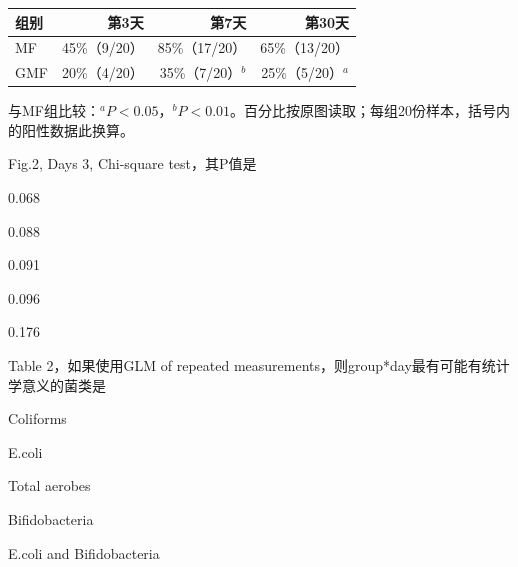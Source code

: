 \begin{center}\small\setlength{\tabcolsep}{5pt}\renewcommand{\arraystretch}{1.18}\begin{tabular}{@{}lrrr@{}}
\toprule
组别 & 第3天 & 第7天 & 第30天 \\
\midrule
MF & 45\%（9/20） & 85\%（17/20） & 65\%（13/20） \\
GMF & 20\%（4/20） & 35\%（7/20）\(^{b}\) & 25\%（5/20）\(^{a}\) \\
\bottomrule\end{tabular}\end{center}

与MF组比较：\(^{a}P<0.05\)，\(^{b}P<0.01\)。百分比按原图读取；每组20份样本，括号内的阳性数据此换算。


\par\addvspace{6pt}\noindent\begin{minipage}{\linewidth}


Fig.2, Days 3, Chi-square test，其P值是


\begin{choices}

\item 0.068

\item 0.088

\item 0.091

\item 0.096

\item 0.176

\end{choices}

\end{minipage}\par\vspace{4pt}

\par\addvspace{6pt}\noindent\begin{minipage}{\linewidth}


Table 2，如果使用GLM of repeated measurements，则group*day最有可能有统计学意义的菌类是


\begin{choices}

\item Coliforms

\item E.coli

\item Total aerobes

\item Bifidobacteria

\item E.coli and Bifidobacteria

\end{choices}

\end{minipage}\par\vspace{4pt}

